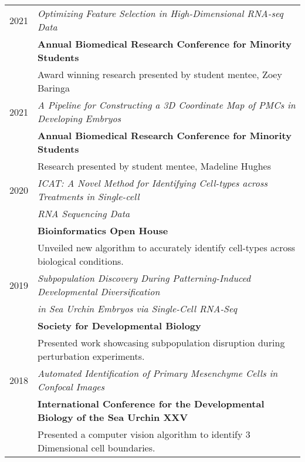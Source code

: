 \documentclass[a4paper,10pt]{article}
\begin{document}
\section{\color{linkcolour}{Selected Posters and Presentations}}
\begin{longtable}{rl}
	\textsc{2021} & \emph{Optimizing Feature Selection in High-Dimensional RNA-seq Data}                 \\
	              & \textbf{Annual Biomedical Research Conference for Minority Students}                 \\
	              & \small{Award winning research presented by student mentee, Zoey Baringa}                           \\
	\textsc{2021} & \emph{A Pipeline for Constructing a 3D Coordinate Map of PMCs in Developing Embryos} \\
	              & \textbf{Annual Biomedical Research Conference for Minority Students}                 \\
	              & \small{Research presented by student mentee, Madeline Hughes}                        \\
	\textsc{2020} & \emph{ICAT: A Novel Method for Identifying Cell-types across
	Treatments in Single-cell}                                                                           \\
	              & \emph{RNA Sequencing Data}                                                           \\
	              & \textbf{Bioinformatics Open House}                                                   \\
	              & \small{Unveiled new algorithm to accurately identify cell-types
	across biological conditions.}                                                                       \\
	\textsc{2019} & \emph{Subpopulation Discovery During Patterning-Induced
	Developmental Diversification}                                                                       \\
	              & \emph{in Sea Urchin Embryos via Single-Cell RNA-Seq}                                 \\
	              & \textbf{Society for Developmental Biology}                                           \\
	              & \small{Presented work showcasing subpopulation disruption
	during perturbation experiments.}                                                                    \\
	\textsc{2018} & \emph{Automated Identification of Primary Mesenchyme Cells
	in Confocal Images}                                                                                  \\
	              & \textbf{International Conference for the Developmental Biology of
	the Sea Urchin XXV}                                                                                  \\
	              & \small{Presented a computer vision algorithm to identify 3
	Dimensional cell boundaries.}                                                                        \\


\end{longtable}
\end{document}
